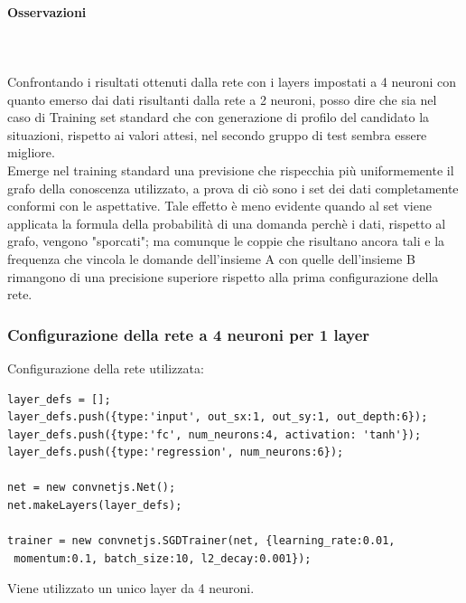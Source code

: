 \paragraph{Osservazioni}\mbox{}
\label{Osservazioni su rete a 2 neuroni per ciascuno dei 2 layers}
\\\\
\noindent
Confrontando i risultati ottenuti dalla rete con i layers impostati a 4 neuroni con quanto emerso dai dati risultanti dalla  rete a 2 neuroni, posso dire che sia nel caso di Training set standard che con generazione di profilo del candidato la situazioni, rispetto ai valori attesi, nel secondo gruppo di test sembra essere migliore.\\
Emerge nel training standard una previsione che rispecchia pi\`u uniformemente il grafo della conoscenza utilizzato, a prova di ci\`o  sono i set dei dati completamente conformi con le aspettative. Tale effetto \`e meno evidente quando al set viene applicata la formula della probabilit\`a di una domanda perch\`e i dati, rispetto al grafo, vengono "sporcati"; ma comunque le coppie che risultano ancora tali e la frequenza che vincola le domande dell'insieme A con quelle dell'insieme B rimangono di una precisione superiore rispetto alla prima configurazione della rete.


\subsubsection{Configurazione della rete a 4 neuroni per 1 layer}
\label{Configurazione della rete a 4 neuroni per 1 layer}

Configurazione della rete utilizzata:\\
\begin{verbatim}layer_defs = [];
layer_defs.push({type:'input', out_sx:1, out_sy:1, out_depth:6});
layer_defs.push({type:'fc', num_neurons:4, activation: 'tanh'});
layer_defs.push({type:'regression', num_neurons:6});

net = new convnetjs.Net();
net.makeLayers(layer_defs);

trainer = new convnetjs.SGDTrainer(net, {learning_rate:0.01,
 momentum:0.1, batch_size:10, l2_decay:0.001});
\end{verbatim}
\noindent
Viene utilizzato un unico layer da 4 neuroni.

